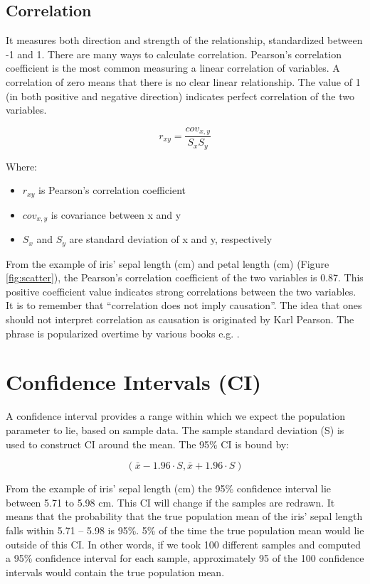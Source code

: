 \documentclass[
]{book}
\providecommand{\tightlist}{%
  \setlength{\itemsep}{0pt}\setlength{\parskip}{0pt}}
\begin{document}
\subsection{Correlation}\label{correlation}

It measures both direction and strength of the relationship, standardized between -1 and 1. There are many ways to calculate correlation. Pearson's correlation coefficient is the most common measuring a linear correlation of variables. A correlation of zero means that there is no clear linear relationship. The value of 1 (in both positive and negative direction) indicates perfect correlation of the two variables.

\[r_{xy} = \frac{cov_{x,y}}{S_x S_y}\]

Where:

\begin{itemize}
\tightlist
\item
  \(r_{xy}\) is Pearson's correlation coefficient
\item
  \(cov_{x,y}\) is covariance between x and y
\item
  \(S_x\) and \(S_y\) are standard deviation of x and y, respectively
\end{itemize}

From the example of iris' sepal length (cm) and petal length (cm) (Figure \ref{fig:scatter}), the Pearson's correlation coefficient of the two variables is 0.87. This positive coefficient value indicates strong correlations between the two variables. It is to remember that ``correlation does not imply causation''. The idea that ones should not interpret correlation as causation is originated by Karl Pearson. The phrase is popularized overtime by various books e.g. \citet{huff1954}.

\section{Confidence Intervals (CI)}\label{confidence-intervals-ci}

A confidence interval provides a range within which we expect the population parameter to lie, based on sample data. The sample standard deviation (S) is used to construct CI around the mean. The 95\% CI is bound by:

\[(\bar{x} - 1.96 \cdot S, \bar{x} + 1.96 \cdot S)\]

From the example of iris' sepal length (cm) the 95\% confidence interval lie between 5.71 to 5.98 cm. This CI will change if the samples are redrawn. It means that the probability that the true population mean of the iris' sepal length falls within 5.71 -- 5.98 is 95\%. 5\% of the time the true population mean would lie outside of this CI. In other words, if we took 100 different samples and computed a 95\% confidence interval for each sample, approximately 95 of the 100 confidence intervals would contain the true population mean.
\end{document}
